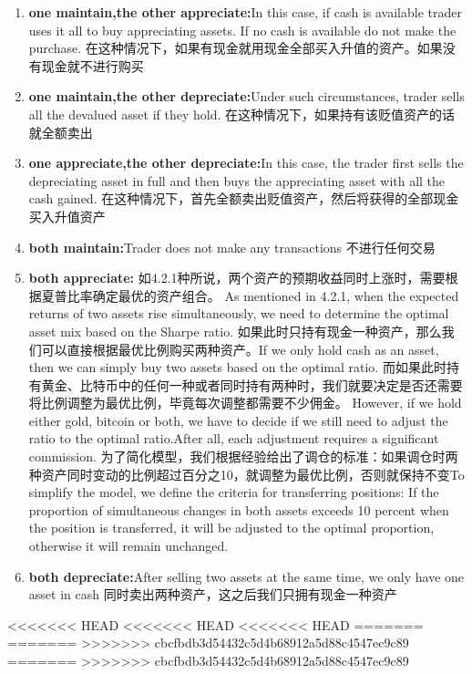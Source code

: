 \documentclass{mcmthesis}
\begin{document}
\begin{enumerate}
  \item \textbf{one maintain,the other appreciate:}In this case, if cash is available trader uses it all to buy appreciating assets. If no cash is available do not make the purchase.
  在这种情况下，如果有现金就用现金全部买入升值的资产。如果没有现金就不进行购买
  \item \textbf{one maintain,the other depreciate:}Under such circumstances, trader sells all the devalued asset if they hold.
  在这种情况下，如果持有该贬值资产的话就全额卖出
  \item \textbf{one appreciate,the other depreciate:}In this case, the trader first sells the depreciating asset in full and then buys the appreciating asset with all the cash gained.
  在这种情况下，首先全额卖出贬值资产，然后将获得的全部现金买入升值资产
  \item \textbf{both maintain:}Trader does not make any transactions
  不进行任何交易
    \item \textbf{both appreciate:}
  如4.2.1种所说，两个资产的预期收益同时上涨时，需要根据夏普比率确定最优的资产组合。
  As mentioned in 4.2.1, when the expected returns of two assets rise simultaneously, we need to determine the optimal asset mix based on the Sharpe ratio.
  如果此时只持有现金一种资产，那么我们可以直接根据最优比例购买两种资产。If we only hold cash as an asset, then we can simply buy two assets based on the optimal ratio.
  而如果此时持有黄金、比特币中的任何一种或者同时持有两种时，我们就要决定是否还需要将比例调整为最优比例，毕竟每次调整都需要不少佣金。
  However, if we hold either gold, bitcoin or both, we have to decide if we still need to adjust the ratio to the optimal ratio.After all, each adjustment requires a significant commission.
  为了简化模型，我们根据经验给出了调仓的标准：如果调仓时两种资产同时变动的比例超过百分之10，就调整为最优比例，否则就保持不变To simplify the model, we define the criteria for transferring positions:
  If the proportion of simultaneous changes in both assets exceeds 10 percent when the position is transferred, it will be adjusted to the optimal proportion, otherwise it will remain unchanged.
  
  \item\textbf{both depreciate:}After selling two assets at the same time, we only have one asset in cash
  同时卖出两种资产，这之后我们只拥有现金一种资产
\end{enumerate}
<<<<<<< HEAD
<<<<<<< HEAD
<<<<<<< HEAD
=======
=======
>>>>>>> cbcfbdb3d54432c5d4b68912a5d88c4547ec9c89
=======
>>>>>>> cbcfbdb3d54432c5d4b68912a5d88c4547ec9c89
\end{document}
